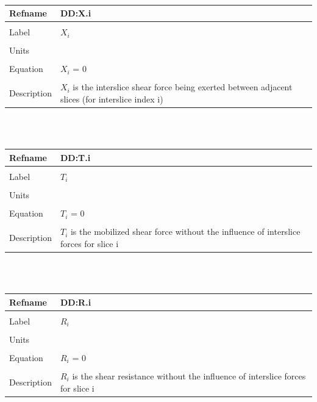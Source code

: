\documentclass[12pt]{article}
\begin{document}
~\newline
\noindent \begin{minipage}{\textwidth}
\begin{tabular}{p{} p{}}
\toprule \textbf{Refname} & \textbf{DD:X.i}
\label{DD:X.i}
\\ \midrule \\
Label & $X_{i}$
\\ \midrule \\
Units & 
\\ \midrule \\
Equation & $X_{i}$ = $0$
\\ \midrule \\
Description & $X_{i}$ is the interslice shear force being exerted between adjacent slices (for interslice index i)
\\ \bottomrule \end{tabular}
\end{minipage}\\
~\newline
\noindent \begin{minipage}{\textwidth}
\begin{tabular}{p{} p{}}
\toprule \textbf{Refname} & \textbf{DD:T.i}
\label{DD:T.i}
\\ \midrule \\
Label & $T_{i}$
\\ \midrule \\
Units & 
\\ \midrule \\
Equation & $T_{i}$ = $0$
\\ \midrule \\
Description & $T_{i}$ is the mobilized shear force without the influence of interslice forces for slice i
\\ \bottomrule \end{tabular}
\end{minipage}\\
~\newline
\noindent \begin{minipage}{\textwidth}
\begin{tabular}{p{} p{}}
\toprule \textbf{Refname} & \textbf{DD:R.i}
\label{DD:R.i}
\\ \midrule \\
Label & $R_{i}$
\\ \midrule \\
Units & 
\\ \midrule \\
Equation & $R_{i}$ = $0$
\\ \midrule \\
Description & $R_{i}$ is the shear resistance without the influence of interslice forces for slice i
\\ \bottomrule \end{tabular}
\end{minipage}\\
\end{document}
